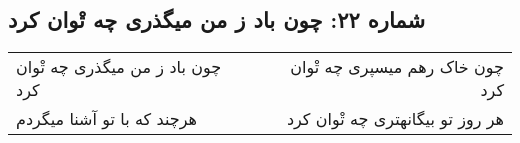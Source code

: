 \begin{center}
\section*{شماره ۲۲: چون باد ز من میگذری چه تْوان کرد}
\label{sec:022}
\begin{longtable}{l p{0.5cm} r}
چون باد ز من میگذری چه تْوان کرد
&&
چون خاک رهم میسپری چه تْوان کرد
\\
هرچند که با تو آشنا میگردم
&&
هر روز تو بیگانهتری چه تْوان کرد
\\
\end{longtable}
\end{center}
